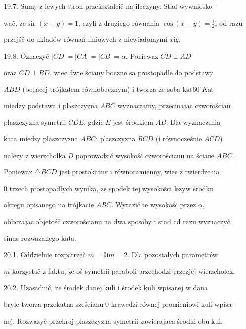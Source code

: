 \documentclass[a4paper,12pt]{article}
\begin{document}
19.7. Sumy $\mathrm{z}$ lewych stron przeksztalcič na iloczyny. Stad wywniosko-

wač, $\dot{\mathrm{z}}\mathrm{e}\sin(x+y)=1$, czyli $\mathrm{z}$ drugiego równania $\displaystyle \cos(x-y)=\frac{1}{2}\mathrm{i}$ od razu

przejśč do ukladów równań liniowych $\mathrm{z}$ niewiadomymi $x\mathrm{i}y.$

19.8. Oznaczyč $|CD| = |CA| = |CB| = \alpha$. Poniewaz $CD \perp AD$

oraz $CD \perp BD$, wiec dwie ściany boczne sa prostopadle do podstawy

$ABD$ (bedacej trójkatem równobocznym) $\mathrm{i}$ tworza ze soba $\mathrm{k}\mathrm{a}\mathrm{t} 60^{\circ} K\mathrm{a}\mathrm{t}$

miedzy podstawa $\mathrm{i}$ plaszczyzna $ABC$ wyznaczamy, przecinajac czworościan

plaszczyzna symetrii $CDE$, gdzie $E$ jest środkiem $AB$. Dla wyznaczenia

kata miedzy plaszczyzna $ABC\mathrm{i}$ plaszczyzna $BCD$ ($\mathrm{i}$ równocześnie $ACD$)

nalezy $\mathrm{z}$ wierzcholka $D$ poprowadzič wysokośč czworościanu na ściane $ABC.$

Poniewaz $\triangle BCD$ jest prostokatny $\mathrm{i}$ równoramienny, wiec $\mathrm{z}$ twierdzenia

$0$ trzech prostopadlych wynika, $\dot{\mathrm{z}}\mathrm{e}$ spodek tej wysokości $\mathrm{l}\mathrm{e}\dot{\mathrm{z}}\mathrm{y} \mathrm{w}$ środku

okregu opisanego na trójkacie $ABC$. Wyrazič $\mathrm{t}\mathrm{e}$ wysokośč przez $\alpha,$

obliczajac objetośč czworościanu na dwa sposoby $\mathrm{i}$ stad od razu wyznaczyč

sinus rozwazanego kata.

20.1. Oddzielnie rozpatrzeč $m=0\mathrm{i}m=2$. Dla pozostalych parametrów

$m$ korzystač $\mathrm{z}$ faktu, $\dot{\mathrm{z}}\mathrm{e}$ oś symetrii paraboli przechodzi przezjej wierzcholek.

20.2. Uzasadnič, $\dot{\mathrm{z}}\mathrm{e}$ środek danej kuli $\mathrm{i}$ środek kuli wpisanej $\mathrm{w}$ dana

bryle tworza przekatna sześcianu $0$ krawedzi równej promieniowi kuli wpisa-

nej. Rozwazyč przekrój plaszczyzna symetrii zawierajaca środki obu $\mathrm{k}\mathrm{u}\mathrm{l}.$
\end{document}
